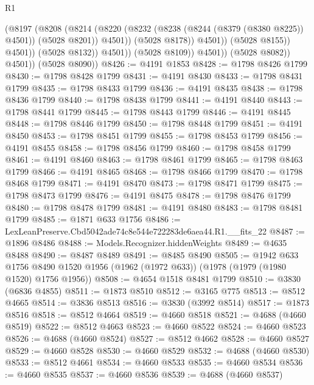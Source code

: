 \begin{lexlean}{R1}
\begin{coremodule}
                                (@8197
                                  (@8208
                                    (@8214
                                      (@8220
                                        (@8232
                                          (@8238 (@8244 (@8379 (@8380 @8225)) @4501))
                                          (@5028 @8201))
                                        @4501))
                                    (@5028 @8178))
                                  @4501))
                              (@5028 @8155))
                            @4501))
                        (@5028 @8132))
                      @4501))
                  (@5028 @8109))
                @4501))
            (@5028 @8082))
          @4501))
      (@5028 @8090))
@8426 := @4191 @1853
@8428 := @1798 @8426 @1799
@8430 := @1798 @8428 @1799
@8431 := @4191 @8430
@8433 := @1798 @8431 @1799
@8435 := @1798 @8433 @1799
@8436 := @4191 @8435
@8438 := @1798 @8436 @1799
@8440 := @1798 @8438 @1799
@8441 := @4191 @8440
@8443 := @1798 @8441 @1799
@8445 := @1798 @8443 @1799
@8446 := @4191 @8445
@8448 := @1798 @8446 @1799
@8450 := @1798 @8448 @1799
@8451 := @4191 @8450
@8453 := @1798 @8451 @1799
@8455 := @1798 @8453 @1799
@8456 := @4191 @8455
@8458 := @1798 @8456 @1799
@8460 := @1798 @8458 @1799
@8461 := @4191 @8460
@8463 := @1798 @8461 @1799
@8465 := @1798 @8463 @1799
@8466 := @4191 @8465
@8468 := @1798 @8466 @1799
@8470 := @1798 @8468 @1799
@8471 := @4191 @8470
@8473 := @1798 @8471 @1799
@8475 := @1798 @8473 @1799
@8476 := @4191 @8475
@8478 := @1798 @8476 @1799
@8480 := @1798 @8478 @1799
@8481 := @4191 @8480
@8483 := @1798 @8481 @1799
@8485 := @1871 @633 @1756
@8486 := LexLeanPreserve.Cbd5042ade74c8e544e722283de6aea44.R1.__fits_22
@8487 := @1896 @8486
@8488 := Models.Recognizer.hiddenWeights
@8489 := @4635 @8488
@8490 := @8487 @8489
@8491 := @8485 @8490
@8505 := @1942
    @633
    @1756
    @8490
    @1520
    @1956
    (@1962 (@1972 @633))
    (@1978 (@1979 (@1980 @1520) @1756 @1956))
@8508 := @4654 @1518 @8481 @1799
@8510 := @3830 (@6836 @4855)
@8511 := @1873 @8510
@8512 := @3165 @775
@8513 := @8512 @4665
@8514 := @3836 @8513
@8516 := @3830 (@3992 @8514)
@8517 := @1873 @8516
@8518 := @8512 @4664
@8519 := @4660 @8518
@8521 := @4688 (@4660 @8519)
@8522 := @8512 @4663
@8523 := @4660 @8522
@8524 := @4660 @8523
@8526 := @4688 (@4660 @8524)
@8527 := @8512 @4662
@8528 := @4660 @8527
@8529 := @4660 @8528
@8530 := @4660 @8529
@8532 := @4688 (@4660 @8530)
@8533 := @8512 @4661
@8534 := @4660 @8533
@8535 := @4660 @8534
@8536 := @4660 @8535
@8537 := @4660 @8536
@8539 := @4688 (@4660 @8537)

\end{coremodule}
\end{lexlean}
